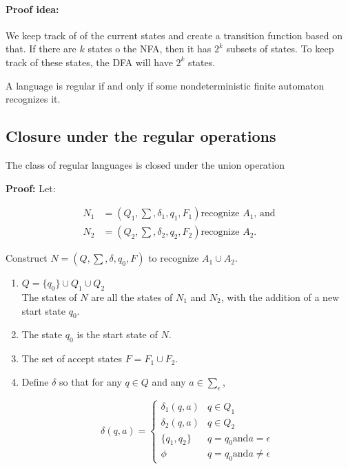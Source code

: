 \paragraph{Proof idea:} We keep track of of the current states and create
a transition function based on that. If there are $k$ states o the NFA, then
it has $2^{k}$ subsets of states. To keep track of these states, the DFA will
have $2^{k}$ states.

\begin{corollary}
    A language is regular if and only if some nondeterministic finite automaton
    recognizes it.
    \label{140}
\end{corollary}

\subsection{Closure under the regular operations}

\begin{theorem}
    The class of regular languages is closed under the union operation
\end{theorem}

\textbf{Proof:} Let:

\begin{align*}
    N_1 &= (Q_1, \sum, \delta_1, q_1, F_1) \text{recognize $A_1$, and}\\
    N_2 &= (Q_2, \sum, \delta_2, q_2, F_2) \text{recognize $A_2$.}
\end{align*}

Construct $N = (Q, \sum, \delta, q_0, F)$ to recognize $A_1 \cup A_2$.

\begin{enumerate}
    \item $Q = \{q_0\} \cup Q_1 \cup Q_2$\\
        The states of $N$ are all the states of $N_1$ and $N_2$, with the
        addition of a new start state $q_0$.
    \item The state $q_0$ is the start state of $N$.
    \item The set of accept states $F = F_1 \cup F_2$.
    \item Define $\delta$ so that for any $q \in Q$ and any $a \in
        \sum_{\epsilon}$,

        $$
            \delta(q, a) = 
            \begin{cases}
                \delta_1(q, a) & q \in Q_1\\
                \delta_2(q, a) & q \in Q_2\\
                \{q_1, q_2\} & q = q_0 \text{and} a = \epsilon\\
                \phi & q = q_0 \text{and} a \neq \epsilon
            \end{cases}
        $$
\end{enumerate}

